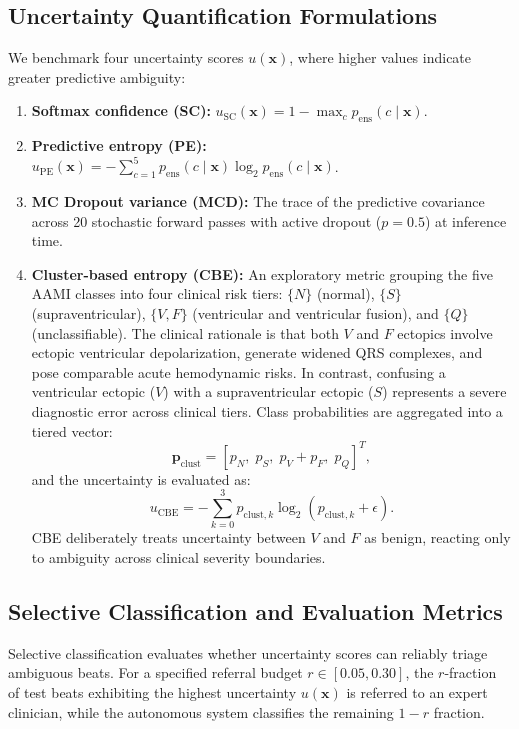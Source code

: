 \documentclass[conference]{IEEEtran}
\begin{document}
\subsection{Uncertainty Quantification Formulations}
We benchmark four uncertainty scores $u(\mathbf{x})$, where higher values indicate greater predictive ambiguity:
\begin{enumerate}
    \item \textbf{Softmax confidence (SC):} $u_{\text{SC}}(\mathbf{x}) = 1 - \max_c p_{\text{ens}}(c \mid \mathbf{x})$.
    \item \textbf{Predictive entropy (PE):} $u_{\text{PE}}(\mathbf{x}) = -\sum_{c=1}^5 p_{\text{ens}}(c \mid \mathbf{x}) \log_2 p_{\text{ens}}(c \mid \mathbf{x})$.
    \item \textbf{MC Dropout variance (MCD):} The trace of the predictive covariance across 20 stochastic forward passes with active dropout ($p=0.5$) at inference time.
    \item \textbf{Cluster-based entropy (CBE):} An exploratory metric grouping the five AAMI classes into four clinical risk tiers: $\{N\}$ (normal), $\{S\}$ (supraventricular), $\{V, F\}$ (ventricular and ventricular fusion), and $\{Q\}$ (unclassifiable). The clinical rationale is that both $V$ and $F$ ectopics involve ectopic ventricular depolarization, generate widened QRS complexes, and pose comparable acute hemodynamic risks. In contrast, confusing a ventricular ectopic ($V$) with a supraventricular ectopic ($S$) represents a severe diagnostic error across clinical tiers. Class probabilities are aggregated into a tiered vector:
    \begin{equation}
    \mathbf{p}_{\text{clust}} = [p_N,\; p_S,\; p_V + p_F,\; p_Q]^T,
    \end{equation}
    and the uncertainty is evaluated as:
    \begin{equation}
    u_{\text{CBE}} = -\sum_{k=0}^3 p_{\text{clust}, k} \log_2 (p_{\text{clust}, k} + \epsilon).
    \end{equation}
    CBE deliberately treats uncertainty between $V$ and $F$ as benign, reacting only to ambiguity across clinical severity boundaries.
\end{enumerate}

\subsection{Selective Classification and Evaluation Metrics}
Selective classification evaluates whether uncertainty scores can reliably triage ambiguous beats. For a specified referral budget $r \in [0.05, 0.30]$, the $r$-fraction of test beats exhibiting the highest uncertainty $u(\mathbf{x})$ is referred to an expert clinician, while the autonomous system classifies the remaining $1-r$ fraction. 
\end{document}
